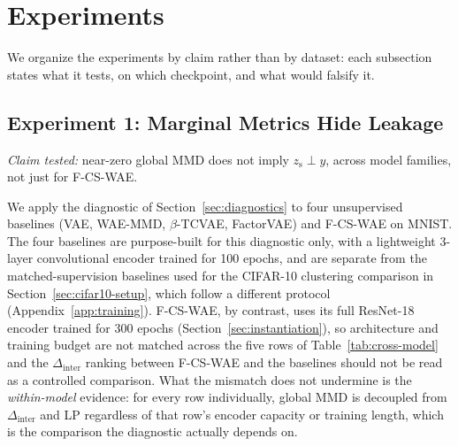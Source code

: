 \documentclass[10pt,letterpaper]{article}
\newcommand{\ours}{F-CS-WAE}
\newcommand{\zs}{z_{\mathrm{s}}}
\begin{document}
\section{Experiments}
\label{sec:experiments}

We organize the experiments by claim rather than by dataset: each
subsection states what it tests, on which checkpoint, and what would
falsify it.

\subsection{Experiment 1: Marginal Metrics Hide Leakage}
\label{sec:cross-model}
\label{sec:cross-model-baseline}

\emph{Claim tested:} near-zero global MMD does not imply
$\zs\perp y$, across model families, not just for \ours{}.

We apply the diagnostic of Section~\ref{sec:diagnostics} to four
unsupervised baselines (VAE, WAE-MMD, $\beta$-TCVAE, FactorVAE) and \ours{}
on MNIST. The four baselines are purpose-built for this diagnostic only,
with a lightweight 3-layer convolutional encoder trained for 100 epochs,
and are separate from the matched-supervision baselines used for the
CIFAR-10 clustering comparison in Section~\ref{sec:cifar10-setup}, which
follow a different protocol (Appendix~\ref{app:training}). \ours{}, by
contrast, uses its full
ResNet-18 encoder trained for 300 epochs (Section~\ref{sec:instantiation}),
so architecture and training budget are not matched across the five rows of
Table~\ref{tab:cross-model} and the $\Delta_{\mathrm{inter}}$ ranking
between \ours{} and the baselines should not be read as a controlled
comparison. What the mismatch does not undermine is the \emph{within-model}
evidence: for every row individually, global MMD is decoupled from
$\Delta_{\mathrm{inter}}$ and LP regardless of that row's encoder capacity
or training length, which is the comparison the diagnostic actually depends
on.
\end{document}
